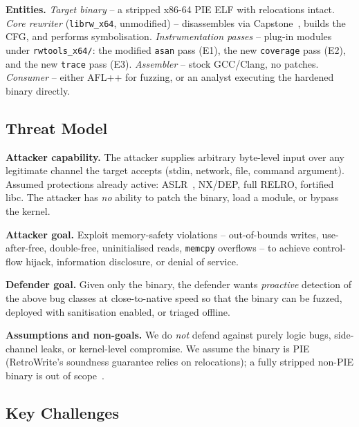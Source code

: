 \documentclass[10pt,a4paper]{article}
\begin{document}
\textbf{Entities.}
\emph{Target binary} -- a stripped x86-64 PIE ELF with relocations intact.
\emph{Core rewriter} (\texttt{librw\_x64}, unmodified) -- disassembles via
Capstone~\cite{capstone}, builds the CFG, and performs symbolisation.
\emph{Instrumentation passes} -- plug-in modules under
\texttt{rwtools\_x64/}: the modified \texttt{asan} pass (E1), the new
\texttt{coverage} pass (E2), and the new \texttt{trace} pass (E3).
\emph{Assembler} -- stock GCC/Clang, no patches.
\emph{Consumer} -- either AFL++ for fuzzing, or an analyst executing the
hardened binary directly.

\subsection{Threat Model}

\textbf{Attacker capability.} The attacker supplies arbitrary byte-level input
over any legitimate channel the target accepts (stdin, network, file, command
argument). Assumed protections already active: ASLR~\cite{aslr}, NX/DEP, full
RELRO, fortified libc. The attacker has \emph{no} ability to patch the
binary, load a module, or bypass the kernel.

\textbf{Attacker goal.} Exploit memory-safety violations -- out-of-bounds
writes, use-after-free, double-free, uninitialised reads, \texttt{memcpy}
overflows -- to achieve control-flow hijack, information disclosure, or
denial of service.

\textbf{Defender goal.} Given only the binary, the defender wants
\emph{proactive} detection of the above bug classes at close-to-native speed
so that the binary can be fuzzed, deployed with sanitisation enabled, or
triaged offline.

\textbf{Assumptions and non-goals.} We do \emph{not} defend against purely
logic bugs, side-channel leaks, or kernel-level compromise. We assume the
binary is PIE (RetroWrite's soundness guarantee relies on relocations); a
fully stripped non-PIE binary is out of scope~\cite{retrowrite}.

\subsection{Key Challenges}
\end{document}
